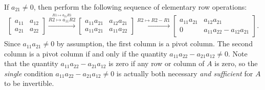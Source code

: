 \documentclass[12pt,letterpaper,reqno]{article}
\numberwithin{equation}{section}
\begin{document}
If $a_{21}\neq 0$, then perform the following sequence of elementary row operations:
\begin{align*}
	\begin{bmatrix}
		a_{11} & a_{12}  \\
		a_{21} & a_{22}  
	\end{bmatrix} \stackrel{\stackrel{R1 \mapsto a_{21}R1}{R2 \mapsto a_{11}R2}}{\longrightarrow} \begin{bmatrix}
		a_{11}a_{21} & a_{12}a_{21}  \\
		a_{11}a_{21} & a_{11}a_{22} 
	\end{bmatrix} \stackrel{R2 \mapsto R2-R1}{\longrightarrow} \begin{bmatrix}
		a_{11}a_{21} & a_{12}a_{21}\\
		0 & a_{11}a_{22}-a_{12}a_{21}
	\end{bmatrix}.
\end{align*}
Since $a_{11}a_{21} \neq 0$ by assumption, the first column is a pivot column. The second column is a pivot column if and only if the quantity $a_{11}a_{22}-a_{21}a_{12} \neq 0$. Note that the quantity $a_{11}a_{22}-a_{21}a_{12}$ is zero if any row or column of $A$ is zero, so the \emph{single} condition $a_{11}a_{22}-a_{21}a_{12} \neq 0$ is actually both necessary \emph{and sufficient} for $A$ to be invertible.
\end{document}
